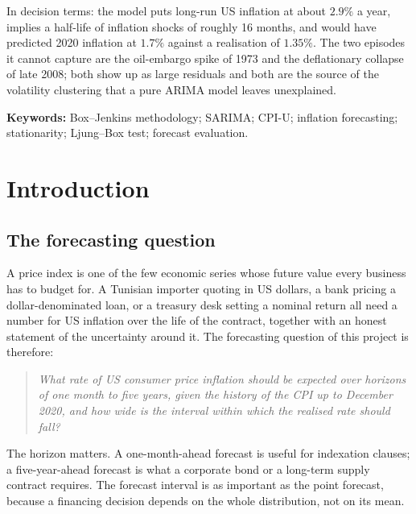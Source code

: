 In decision terms: the model puts long-run US inflation at about
$2.9\%$ a year, implies a half-life of inflation shocks of roughly 16 months, and
would have predicted 2020 inflation at $1.7\%$ against a realisation of $1.35\%$.
The two episodes it cannot capture are the oil-embargo spike of 1973 and the
deflationary collapse of late 2008; both show up as large residuals and both are
the source of the volatility clustering that a pure ARIMA model leaves unexplained.

\vspace{0.6em}
\noindent\textbf{Keywords:} Box--Jenkins methodology; SARIMA; CPI-U; inflation forecasting;
stationarity; Ljung--Box test; forecast evaluation.

\clearpage
\tableofcontents
\clearpage
{}

\section{Introduction}

\subsection{The forecasting question}

A price index is one of the few economic series whose future value every
business has to budget for. A Tunisian importer quoting in US dollars, a bank
pricing a dollar-denominated loan, or a treasury desk setting a nominal return
all need a number for US inflation over the life of the contract, together with
an honest statement of the uncertainty around it. The forecasting question of
this project is therefore:

\begin{quote}
\emph{What rate of US consumer price inflation should be expected over horizons of
one month to five years, given the history of the CPI up to December 2020, and how
wide is the interval within which the realised rate should fall?}
\end{quote}

The horizon matters. A one-month-ahead forecast is useful for indexation clauses;
a five-year-ahead forecast is what a corporate bond or a long-term supply contract
requires. The forecast interval is as important as the point forecast, because a
financing decision depends on the whole distribution, not on its mean.

